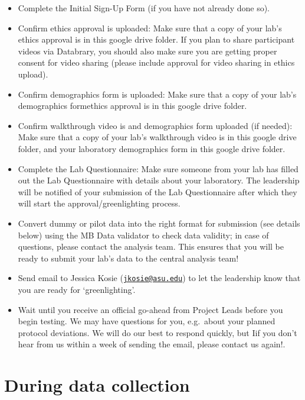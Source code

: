 \documentclass[
]{book}
\providecommand{\tightlist}{%
  \setlength{\itemsep}{0pt}\setlength{\parskip}{0pt}}
\begin{document}
\begin{itemize}
\tightlist
\item
  Complete the Initial Sign-Up Form (if you have not already done so).
\item
  Confirm ethics approval is uploaded: Make sure that a copy of your lab's ethics approval is in this google drive folder. If you plan to share participant videos via Databrary, you should also make sure you are getting proper consent for video sharing (please include approval for video sharing in ethics upload).
\item
  Confirm demographics form is uploaded: Make sure that a copy of your lab's demographics formethics approval is in this google drive folder.
\item
  Confirm walkthrough video is and demographics form uploaded (if needed): Make sure that a copy of your lab's walkthrough video is in this google drive folder, and your laboratory demographics form in this google drive folder.
\item
  Complete the Lab Questionnaire: Make sure someone from your lab has filled out the Lab Questionnaire with details about your laboratory. The leadership will be notified of your submission of the Lab Questionnaire after which they will start the approval/greenlighting process.
\item
  Convert dummy or pilot data into the right format for submission (see details below) using the MB Data validator to check data validity; in case of questions, please contact the analysis team. This ensures that you will be ready to submit your lab's data to the central analysis team!
\item
  Send email to Jessica Kosie (\href{mailto:jkosie@asu.edu}{\nolinkurl{jkosie@asu.edu}}) to let the leadership know that you are ready for `greenlighting'.
\item
  Wait until you receive an official go-ahead from Project Leads before you begin testing. We may have questions for you, e.g.~about your planned protocol deviations. We will do our best to respond quickly, but Iif you don't hear from us within a week of sending the email, please contact us again!.
\end{itemize}

\hypertarget{during-data-collection}{%
\chapter{During data collection}\label{during-data-collection}}
\end{document}

